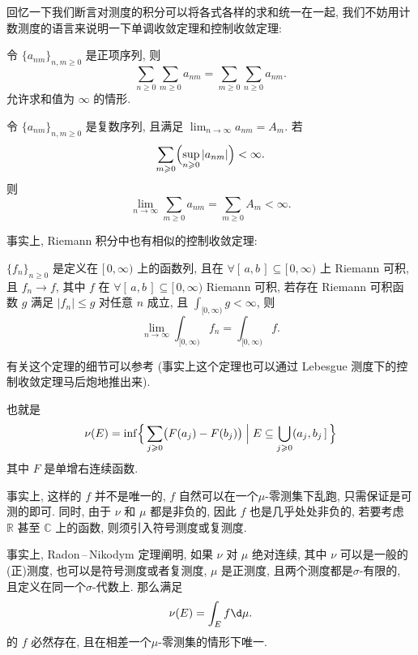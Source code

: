 \begin{alterendnote}
    回忆一下我们断言对测度的积分可以将各式各样的求和统一在一起, 我们不妨用计数测度的语言来说明一下单调收敛定理和控制收敛定理:
    \begin{theorem}[单调收敛定理]
        令 $\{a_{nm}\}_{n,m\geqslant 0}$ 是正项序列, 则
        \[
            \sum_{n\geqslant 0}\sum_{m\geqslant 0}a_{nm} = \sum_{m\geqslant 0}\sum_{n\geqslant 0}a_{nm}
            .\]
        允许求和值为 $\infty$ 的情形.
    \end{theorem}
    \begin{theorem}[控制收敛定理]
        令 $\{a_{nm}\}_{n,m\geqslant 0}$ 是复数序列, 且满足 $\lim_{n \to \infty} a_{nm} = A_m$. 若
        \[
            \sum_{m\geqslant 0}\Bigl(\sup_{n\geqslant 0} |a_{nm}|\Bigr) <\infty
            .\]
        则
        \[
            \lim_{n \to \infty}\sum_{m\geqslant 0}a_{nm} = \sum_{m\geqslant 0}A_m < \infty
            .\]
    \end{theorem}
\end{alterendnote}
\begin{alterendnote}
    事实上, Riemann 积分中也有相似的控制收敛定理:
    \begin{theorem}
        $\{f_n\}_{n\geqslant 0}$ 是定义在 $[\,0,\infty)$ 上的函数列, 且在 $\forall[\,a,b\,]\subseteq[\,0,\infty)$ 上 Riemann 可积, 且 $f_n\to f$, 其中 $f$ 在 $\forall[\,a,b\,]\subseteq[\,0,\infty)$ Riemann 可积, 若存在 Riemann 可积函数 $g$ 满足 $|f_n|\leqslant g$ 对任意 $n$ 成立, 且 $\int_{[0,\infty)}g<\infty$, 则  \[\lim_{n \to \infty} \int_{[0,\infty)} f_n = \int_{[0,\infty)} f.\]
    \end{theorem}
    \noindent 有关这个定理的细节可以参考\cite{Cunningham67} (事实上这个定理也可以通过 Lebesgue 测度下的控制收敛定理马后炮地推出来).
\end{alterendnote}
\begin{alterendnote}
    也就是\[\nu (E)=\inf\Bigl\{ \,\sum_{j\geqslant 0}\bigl(F(a_j)-F(b_j)\bigr)\Bigm| E\subseteq\bigcup_{j\geqslant 0}(a_j,b_j\,]\, \Bigr\}\]其中 $F$ 是单增右连续函数.
\end{alterendnote}
\begin{alterendnote}
    事实上, 这样的 $f$ 并不是唯一的, $f$ 自然可以在一个$\mu $-零测集下乱跑, 只需保证是可测的即可. 同时, 由于 $\nu $ 和 $\mu $ 都是非负的, 因此 $f$ 也是几乎处处非负的, 若要考虑 $\mathbb R$ 甚至 $\mathbb C$ 上的函数, 则须引入符号测度或复测度.
\end{alterendnote}
\begin{alterendnote}
    事实上, Radon\,--\,Nikodym 定理阐明, 如果 $\nu$ 对 $\mu $ 绝对连续, 其中 $\nu$ 可以是一般的(正)测度, 也可以是符号测度或者复测度, $\mu $ 是正测度, 且两个测度都是$\sigma $-有限的, 且定义在同一个$\sigma $-代数上. 那么满足
    \[
        \nu (E) = \int_E f\d \mu
        .\]
    的 $f$ 必然存在, 且在相差一个$\mu $-零测集的情形下唯一.
\end{alterendnote}
